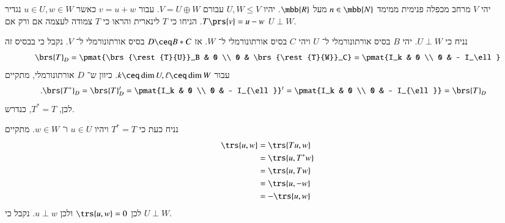 \documentclass[a4paper,10pt,oneside,openany]{article}
\begin{document}
\begin{exercise}
יהי
$V$
מרחב מכפלה פנימית ממימד
$n \in \mbb{N}$
מעל
$\mbb{R}$.
יהיו
$U,W \leq V$
עבורם
$V = U \oplus W$.
עבור
$v = u + w$
כאשר
$u \in U, w \in W$
נגדיר
$T\prs{v} = u - w$.
הניחו כי
$T$
לינארית והראו כי
$T$
צמודה לעצמה אם ורק אם
$U \perp W$.
\end{exercise}

\begin{solution}
נניח כי
$U \perp W$.
יהי
$B$
בסיס אורתונורמלי ל־%
$U$
ויהי
$C$
בסיס אורתונורמלי ל־%
$W$.
אז
$D \ceq B * C$
בסיס אורתונורמלי ל־%
$V$.
נקבל כי בבסיס זה
\[\brs{T}_D = \pmat{\brs{\rest{T}{U}}_B & 0 \\ 0 & \brs{\rest{T}{W}}_C} = \pmat{I_k & 0 \\ 0 & - I_\ell}\]
עבור
$k \ceq \dim U, \ell \ceq \dim W$.
כיוון ש־%
$D$
אורתונורמלי, מתקיים
\begin{align*}
\text{.} \brs{T^*}_D &= \brs{T}_D^t = \pmat{I_k & 0 \\ 0 & - I_{\ell}}^t = \pmat{I_k & 0 \\ 0 & - I_{\ell}} = \brs{T}_D
\end{align*}
לכן,
$T^* = T$,
כנדרש.

נניח כעת כי
$T^* = T$
ויהיו
$u \in U$
ו־%
$w \in W$.
מתקיים
\begin{align*}
\trs{u,w} &= \trs{Tu, w}
\\&= \trs{u, T^*  w}
\\&= \trs{u, T w}
\\&= \trs{u, -w}
\\&= -\trs{u,w}
\end{align*}
לכן
$\trs{u,w} = 0$
ולכן
$u \perp w$.
נקבל כי
$U \perp W$.
\end{solution}
\end{document}
